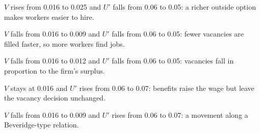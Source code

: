 \begin{alternativas}
\item $V$ rises from 0.016 to 0.025 and $U'$ falls from 0.06 to 0.05: a richer outside option makes workers easier to hire.
\item $V$ falls from 0.016 to 0.009 and $U'$ falls from 0.06 to 0.05: fewer vacancies are filled faster, so more workers find jobs.
\item $V$ falls from 0.016 to 0.012 and $U'$ falls from 0.06 to 0.05: vacancies fall in proportion to the firm's surplus.
\item $V$ stays at 0.016 and $U'$ rises from 0.06 to 0.07: benefits raise the wage but leave the vacancy decision unchanged.
\item $V$ falls from 0.016 to 0.009 and $U'$ rises from 0.06 to 0.07: a movement along a Beveridge-type relation.
\end{alternativas}
